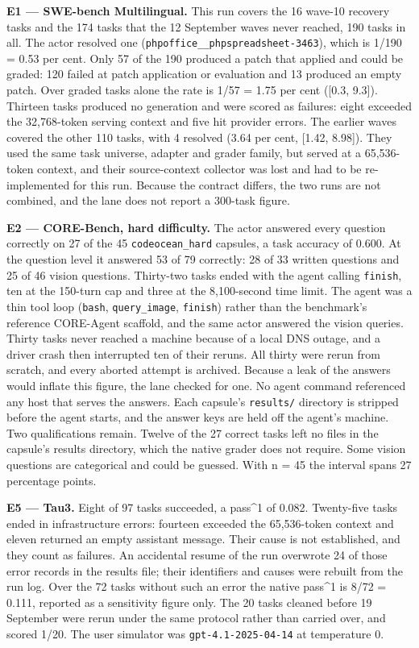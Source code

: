\documentclass[12pt,a4paper]{report}
\begin{document}
\textbf{E1 --- SWE-bench Multilingual.} This run covers the 16 wave-10
recovery tasks and the 174 tasks that the 12 September waves never
reached, 190 tasks in all. The actor resolved one
(\texttt{phpoffice\_\_phpspreadsheet-3463}), which is 1/190 = 0.53 per
cent. Only 57 of the 190 produced a patch that applied and could be
graded: 120 failed at patch application or evaluation and 13 produced an
empty patch. Over graded tasks alone the rate is 1/57 = 1.75 per cent
({[}0.3, 9.3{]}). Thirteen tasks produced no generation and were scored
as failures: eight exceeded the 32,768-token serving context and five
hit provider errors. The earlier waves covered the other 110 tasks, with
4 resolved (3.64 per cent, {[}1.42, 8.98{]}). They used the same task
universe, adapter and grader family, but served at a 65,536-token
context, and their source-context collector was lost and had to be
re-implemented for this run. Because the contract differs, the two runs
are not combined, and the lane does not report a 300-task figure.

\textbf{E2 --- CORE-Bench, hard difficulty.} The actor answered every
question correctly on 27 of the 45 \texttt{codeocean\_hard} capsules, a
task accuracy of 0.600. At the question level it answered 53 of 79
correctly: 28 of 33 written questions and 25 of 46 vision questions.
Thirty-two tasks ended with the agent calling \texttt{finish}, ten at
the 150-turn cap and three at the 8,100-second time limit. The agent was
a thin tool loop (\texttt{bash}, \texttt{query\_image}, \texttt{finish})
rather than the benchmark's reference CORE-Agent scaffold, and the same
actor answered the vision queries. Thirty tasks never reached a machine
because of a local DNS outage, and a driver crash then interrupted ten
of their reruns. All thirty were rerun from scratch, and every aborted
attempt is archived. Because a leak of the answers would inflate this
figure, the lane checked for one. No agent command referenced any host
that serves the answers. Each capsule's \texttt{results/} directory is
stripped before the agent starts, and the answer keys are held off the
agent's machine. Two qualifications remain. Twelve of the 27 correct
tasks left no files in the capsule's results directory, which the native
grader does not require. Some vision questions are categorical and could
be guessed. With n = 45 the interval spans 27 percentage points.

\textbf{E5 --- Tau3.} Eight of 97 tasks succeeded, a pass\^{}1 of 0.082.
Twenty-five tasks ended in infrastructure errors: fourteen exceeded the
65,536-token context and eleven returned an empty assistant message.
Their cause is not established, and they count as failures. An
accidental resume of the run overwrote 24 of those error records in the
results file; their identifiers and causes were rebuilt from the run
log. Over the 72 tasks without such an error the native pass\^{}1 is
8/72 = 0.111, reported as a sensitivity figure only. The 20 tasks
cleaned before 19 September were rerun under the same protocol rather
than carried over, and scored 1/20. The user simulator was
\texttt{gpt-4.1-2025-04-14} at temperature 0.
\end{document}
